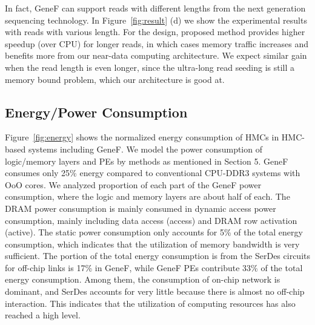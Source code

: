 \documentclass[9pt,conference]{IEEEtran}
\begin{document}
In fact, GeneF can support reads with different lengths from the next generation sequencing technology. In Figure~\ref{fig:result} (d) we show the experimental results with reads with various length. For the design, proposed method provides higher speedup (over CPU) for longer reads, in which cases memory traffic increases and benefits more from our near-data computing architecture. We expect similar gain when the read length is even longer, since the ultra-long read seeding is still a memory bound problem, which our architecture is good at.

\subsection{Energy/Power Consumption}
Figure~\ref{fig:energy} shows the normalized energy consumption of HMCs in HMC-based systems including GeneF. We model the power consumption of logic/memory layers and PEs by methods as mentioned in Section 5. GeneF consumes only 25\% energy compared to conventional CPU-DDR3 systems with OoO cores. We analyzed proportion of each part of the GeneF power consumption, where the logic and memory layers are about half of each. The DRAM power consumption is mainly consumed in dynamic access power consumption, mainly including data access (access) and DRAM row activation (active). The static power consumption only accounts for 5\% of the total energy consumption, which indicates that the utilization of memory bandwidth is very sufficient. The portion of the total energy consumption is from the SerDes circuits for off-chip links is 17\% in GeneF, while GeneF PEs contribute 33\% of the total energy consumption. Among them, the consumption of on-chip network is dominant, and SerDes accounts for very little because there is almost no off-chip interaction. This indicates that the utilization of computing resources has also reached a high level.
\end{document}

